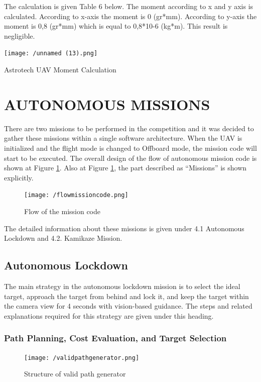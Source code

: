 \documentclass[12pt]{article}
\begin{document}
\justify
The calculation is given Table 6 below. The moment according to x and y axis is calculated. According to x-axis the moment is 0 (gr*mm). According to y-axis the moment is 0,8 (gr*mm) which is equal to 0,8*10-6 (kg*m). This result is negligible. 

\begin{table}[ht]
 	\centering
 	\texttt{[image: /unnamed (13).png]}
 	\caption{Astrotech UAV Moment Calculation}
        \label{fig:moment}
 \end{table}
\FloatBarrier


\section{AUTONOMOUS MISSIONS}
There are two missions to be performed in the competition and it was decided to gather these missions within a single software architecture. When the UAV is initialized and the flight mode is changed to Offboard mode, the mission code will start to be executed. The overall design of the flow of autonomous mission code is shown at Figure \ref{fig:flow}.  Also at Figure \ref{fig:flow}, the part described as “Missions” is shown explicitly. 

\begin{figure}[ht]
 	\centering
 	\texttt{[image: /flowmissioncode.png]}
 	\caption{Flow of the mission code}
        \label{fig:flow}
 \end{figure}
\FloatBarrier
\justify
The detailed information about these missions is given under 4.1 Autonomous Lockdown and  4.2. Kamikaze Mission.

\subsection{Autonomous Lockdown}
The main strategy in the autonomous lockdown mission is to select the ideal target, approach the target from behind and lock it, and keep the target within the camera view for 4 seconds with vision-based guidance. The steps and related explanations required for this strategy are given under this heading.
\subsubsection{Path Planning, Cost Evaluation, and Target Selection}

\begin{figure}[ht]
 	\centering
 	\texttt{[image: /validpathgenerator.png]}
 	\caption{Structure of valid path generator}
        \label{fig:moment}
 \end{figure}
\FloatBarrier
\end{document}
